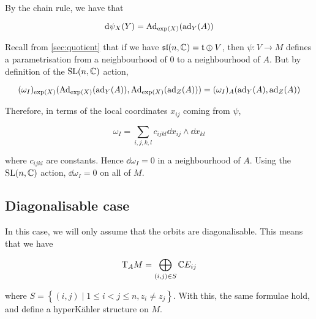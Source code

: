 \documentclass{article}
\renewcommand{\sl}{\mathfrak{sl}}
\begin{document}
By the chain rule, we have that

\[\dd\psi_X(Y) = \operatorname{Ad}_{\exp(X)}(\operatorname{ad}_Y(A))\]

Recall from \cref{sec:quotient} that if we have \(\sl(n, \C) = \mft \oplus V\), then \(\psi : V \to M\) defines a parametrisation from a neighbourhood of \(0\) to a neighbourhood of \(A\). But by definition of the \(\operatorname{SL}(n, \mathbb{C})\) action,

\[(\omega_I)_{\exp(X)}(\operatorname{Ad}_{\exp(X)}(\operatorname{ad}_Y(A)), \operatorname{Ad}_{\exp(X)}(\operatorname{ad}_Z(A))) = (\omega_I)_A(\operatorname{ad}_Y(A), \operatorname{ad}_Z(A))\]

Therefore, in terms of the local coordinates \(x_{ij}\) coming from \(\psi\),

\[\omega_I = \sum_{i, j, k, l}c_{ijkl}\dd x_{ij} \wedge \dd x_{kl}\]

where \(c_{ijkl}\) are constants. Hence \(\dd \omega_I = 0\) in a neighbourhood of \(A\). Using the \(\operatorname{SL}(n, \mathbb{C})\) action, \(\dd\omega_I = 0\) on all of \(M\).

\subsection{Diagonalisable case}

In this case, we will only assume that the orbits are diagonalisable. This means that we have

\[\mathrm{T}_AM = \bigoplus_{(i, j) \in S}\mathbb{C} E_{ij}\]

where \(S = \left\{(i, j) \mid 1 \le i < j \le n, z_i \ne z_j\right\}\). With this, the same formulae hold, and define a hyperK\"ahler structure on \(M\).






\printbibliography
\end{document}
